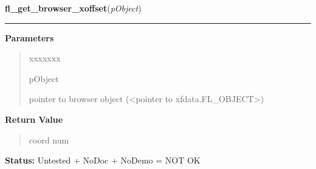 \hspace{.8\funcindent}\begin{boxedminipage}{\funcwidth}

    \raggedright \textbf{fl\_get\_browser\_xoffset}(\textit{pObject})

    \vspace{-1.5ex}

    \rule{\textwidth}{0.5\fboxrule}
\setlength{\parskip}{2ex}
\setlength{\parskip}{1ex}
      \textbf{Parameters}
      \vspace{-1ex}

      \begin{quote}
        \begin{Ventry}{xxxxxxx}

          \item[pObject]

          pointer to browser object ({\textless}pointer to 
          xfdata.FL\_OBJECT{\textgreater})

        \end{Ventry}

      \end{quote}

      \textbf{Return Value}
    \vspace{-1ex}

      \begin{quote}
      coord num

      \end{quote}

\textbf{Status:} Untested + NoDoc + NoDemo = NOT OK



    \end{boxedminipage}

    \label{xformslib:library:fl_get_browser_rel_xoffset}

    \vspace{0.5ex}

